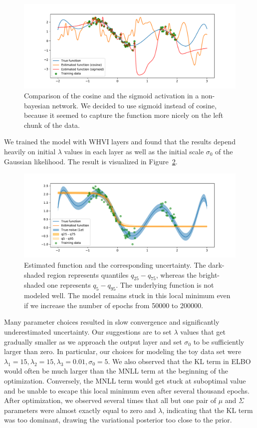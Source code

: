 \begin{figure}
    \centering
    \includegraphics[width=1.0\hsize]{img/toy-function-non-bayesian}
    \caption{Comparison of the cosine and the sigmoid activation in a non-bayesian network.
    We decided to use sigmoid instead of cosine, because it seemed to capture the function more nicely on the left chunk of the data.}
    \label{fig:toy-function-non-bayesian}
\end{figure}

We trained the model with WHVI layers and found that the results depend heavily on initial $\lambda$ values in each layer as well as the initial scale $\sigma_0$ of the Gaussian likelihood.
The result is visualized in Figure~\ref{fig:toy-function-whvi}.
\begin{figure}[htbp]
    \centering
    \includegraphics[width=1.0\hsize]{img/bayesian-fit-with-kl}
    \caption{
    Estimated function and the corresponding uncertainty.
    The dark-shaded region represents quantiles $q_{25}-q_{75}$, whereas the bright-shaded one represents $q_{5}-q_{95}$.
    The underlying function is not modeled well.
    The model remains stuck in this local minimum even if we increase the number of epochs from 50000 to 200000.}
    \label{fig:toy-function-whvi}
\end{figure}

Many parameter choices resulted in slow convergence and significantly underestimated uncertainty.
Our suggestions are to set $\lambda$ values that get gradually smaller as we approach the output layer and set $\sigma_0$ to be sufficiently larger than zero.
In particular, our choices for modeling the toy data set were $\lambda_1=15, \lambda_2=15,\lambda_3=0.01, \sigma_0=5$.
We also observed that the KL term in ELBO would often be much larger than the MNLL term at the beginning of the optimization.
Conversely, the MNLL term would get stuck at suboptimal value and be unable to escape this local minimum even after several thousand epochs.
After optimization, we observed several times that all but one pair of $\mu$ and $\Sigma$ parameters were almost exactly equal to zero and $\lambda$, indicating that the KL term was too dominant, drawing the variational posterior too close to the prior.

